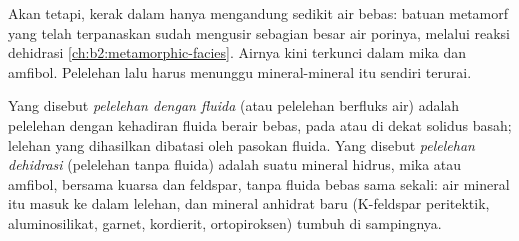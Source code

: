 \begin{omfigure}
\centering
{}
\par{}
\end{omfigure}

Akan tetapi, kerak dalam hanya mengandung sedikit air bebas: batuan metamorf yang telah terpanaskan
sudah mengusir sebagian besar air porinya, melalui reaksi dehidrasi
\cref{ch:b2:metamorphic-facies}. Airnya kini terkunci dalam mika dan amfibol. Pelelehan
lalu harus menunggu mineral-mineral itu sendiri terurai.

\begin{definition}\label{def:b2:crustal-melting:reactions}
Yang disebut \emph{pelelehan dengan fluida} (atau pelelehan berfluks air) adalah
pelelehan dengan kehadiran fluida berair bebas, pada atau di dekat solidus basah; lelehan
yang dihasilkan dibatasi oleh pasokan fluida. Yang disebut \emph{pelelehan dehidrasi} (pelelehan tanpa fluida) adalah
 suatu mineral hidrus, mika atau
amfibol, bersama kuarsa dan feldspar, tanpa fluida bebas sama sekali: air mineral itu
masuk ke dalam lelehan, dan mineral anhidrat baru (K-feldspar peritektik, aluminosilikat,
garnet, kordierit, ortopiroksen) tumbuh di sampingnya.
\end{definition}


